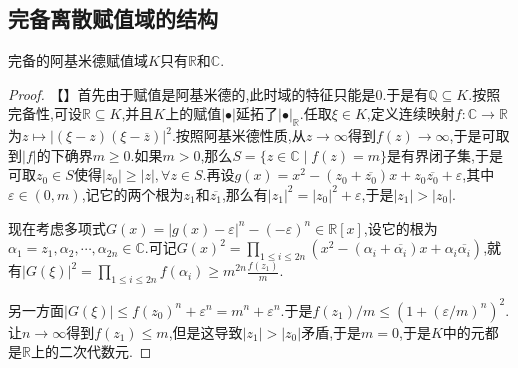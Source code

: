 \subsection{完备离散赋值域的结构}

完备的阿基米德赋值域$K$只有$\mathbb{R}$和$\mathbb{C}$.
\begin{proof}
	
	【】首先由于赋值是阿基米德的,此时域的特征只能是0.于是有$\mathbb{Q}\subseteq K$.按照完备性,可设$\mathbb{R}\subseteq K$,并且$K$上的赋值$|\bullet|$延拓了$|\bullet|_{\mathbb{R}}$.任取$\xi\in K$,定义连续映射$f:\mathbb{C}\to\mathbb{R}$为$z\mapsto|(\xi-z)(\xi-\overline{z})|^2$.按照阿基米德性质,从$z\to\infty$得到$f(z)\to\infty$,于是可取到$|f|$的下确界$m\ge0$.如果$m>0$,那么$S=\{z\in\mathbb{C}\mid f(z)=m\}$是有界闭子集,于是可取$z_0\in S$使得$|z_0|\ge|z|,\forall z\in S$.再设$g(x)=x^2-(z_0+\overline{z_0})x+z_0\overline{z_0}+\varepsilon$,其中$\varepsilon\in(0,m)$,记它的两个根为$z_1$和$\overline{z_1}$,那么有$|z_1|^2=|z_0|^2+\varepsilon$,于是$|z_1|>|z_0|$.
	
	现在考虑多项式$G(x)=|g(x)-\varepsilon|^n-(-\varepsilon)^n\in\mathbb{R}[x]$,设它的根为$\alpha_1=z_1,\alpha_2,\cdots,\alpha_{2n}\in\mathbb{C}$.可记$G(x)^2=\prod_{1\le i\le 2n}(x^2-(\alpha_i+\overline{\alpha_i})x+\alpha_i\overline{\alpha_i})$,就有$|G(\xi)|^2=\prod_{1\le i\le 2n}f(\alpha_i)\ge m^{2n}\frac{f(z_1)}{m}$.
	
	另一方面$|G(\xi)|\le f(z_0)^n+\varepsilon^n=m^n+\varepsilon^n$.于是$f(z_1)/m\le(1+(\varepsilon/m)^n)^2$.让$n\to\infty$得到$f(z_1)\le m$,但是这导致$|z_1|>|z_0|$矛盾,于是$m=0$,于是$K$中的元都是$\mathbb{R}$上的二次代数元.
\end{proof}

